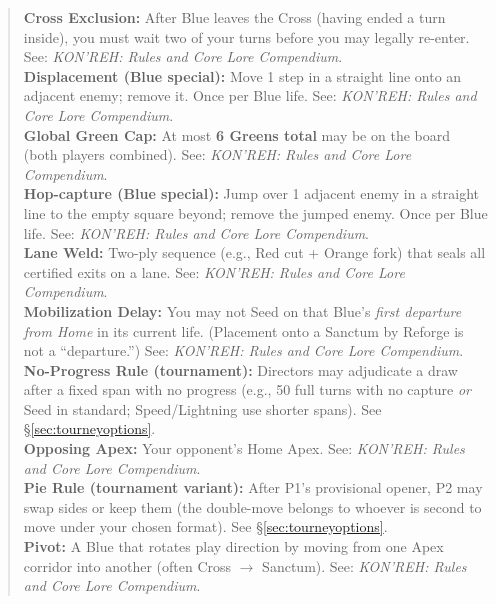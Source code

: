 \documentclass[11pt]{article}
\begin{document}
\begin{quote}
\textbf{Cross Exclusion:} After Blue leaves the Cross (having ended a turn inside), you must wait two of your turns before you may legally re-enter. See: \textit{KON’REH: Rules and Core Lore Compendium}.\\

\textbf{Displacement (Blue special):} Move 1 step in a straight line onto an adjacent enemy; remove it. Once per Blue life. See: \textit{KON’REH: Rules and Core Lore Compendium}.\\

\textbf{Global Green Cap:} At most \textbf{6 Greens total} may be on the board (both players combined). See: \textit{KON’REH: Rules and Core Lore Compendium}.\\

\textbf{Hop-capture (Blue special):} Jump over 1 adjacent enemy in a straight line to the empty square beyond; remove the jumped enemy. Once per Blue life. See: \textit{KON’REH: Rules and Core Lore Compendium}.\\

\textbf{Lane Weld:} Two-ply sequence (e.g., Red cut + Orange fork) that seals all certified exits on a lane. See: \textit{KON’REH: Rules and Core Lore Compendium}.\\

\textbf{Mobilization Delay:} You may not Seed on that Blue’s \emph{first departure from Home} in its current life. (Placement onto a Sanctum by Reforge is not a “departure.”) See: \textit{KON’REH: Rules and Core Lore Compendium}.\\

\textbf{No-Progress Rule (tournament):} Directors may adjudicate a draw after a fixed span with no progress (e.g., 50 full turns with no capture \emph{or} Seed in standard; Speed/Lightning use shorter spans). See \S\ref{sec:tourneyoptions}.\\

\textbf{Opposing Apex:} Your opponent’s Home Apex. See: \textit{KON’REH: Rules and Core Lore Compendium}.\\

\textbf{Pie Rule (tournament variant):} After P1’s provisional opener, P2 may swap sides or keep them (the double-move belongs to whoever is second to move under your chosen format). See \S\ref{sec:tourneyoptions}.\\

\textbf{Pivot:} A Blue that rotates play direction by moving from one Apex corridor into another (often Cross $\rightarrow$ Sanctum). See: \textit{KON’REH: Rules and Core Lore Compendium}.\\


\end{quote}
\end{document}
